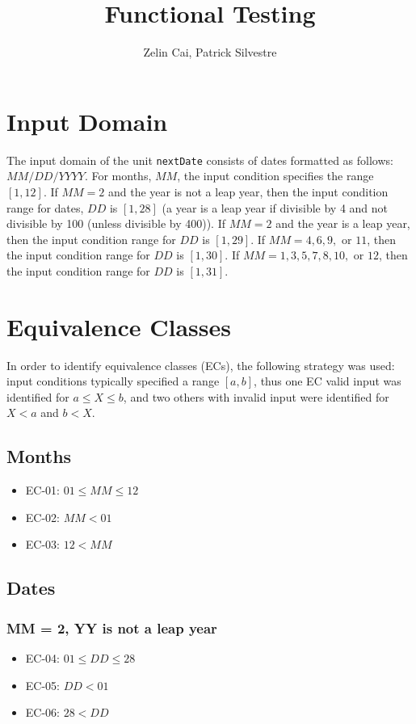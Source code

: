 \documentclass[11pt, oneside]{article}   	%
\title{Functional Testing}
\author{Zelin Cai, Patrick Silvestre}
\date{}
\begin{document}
\maketitle

\section{Input Domain}
The input domain of the unit \texttt{nextDate} consists of dates formatted as follows: $MM/DD/YYYY$. For months, $MM$, the input condition specifies the range $[1, 12]$. If $MM = 2$ and the year is not a leap year, then the input condition range for dates, $DD$ is $[1, 28]$ (a year is a leap year if divisible by 4 and not divisible by 100 (unless divisible by 400)). If $MM = 2$  and the year is a leap year, then the input condition range for $DD$ is $[1, 29]$. If $MM = 4, 6, 9,$ or $11$, then the input condition range for $DD$ is $[1, 30]$. If $MM = 1, 3, 5, 7, 8, 10,$ or $12$, then the input condition range for $DD$ is $[1, 31]$.

\section{Equivalence Classes}
In order to identify equivalence classes (ECs), the following strategy was used: input conditions typically specified a range $[a, b]$, thus one EC valid input was identified for $a \leq X \leq b$, and two others with invalid input were identified for $X < a$ and $b < X$.

\subsection{Months}
	\begin{itemize}
		\item{EC-01: $01 \leq MM \leq 12$}
		\item{EC-02: $MM < 01$}
		\item{EC-03: $12 < MM$}
	\end{itemize}

\subsection{Dates}
\subsubsection{MM = 2, YY is not a leap year}
	\begin{itemize}
		\item{EC-04: $01 \leq DD \leq 28$}
		\item{EC-05: $DD < 01$}
		\item{EC-06: $28 < DD$}
	\end{itemize}
\end{document}
